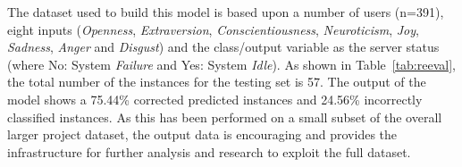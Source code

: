 \documentclass[graybox]{svmult}
\begin{document}
{{{The dataset used to build this model is based upon a number of users
(n=391), eight inputs ({\emph{Openness}}, {\emph{Extraversion}},
{\emph{Conscientiousness}}, {\emph{Neuroticism}}, {\emph{Joy}},
{\emph{Sadness}}, {\emph{Anger}} and {\emph{Disgust}}) and the
class/output variable as the server status (where No: System
{\emph{Failure}} and Yes: System {\emph{Idle}}). As shown in
Table~\ref{tab:reeval}, the total number of the instances for the
testing set is 57. The output of the model shows a 75.44\% corrected
predicted instances and 24.56\% incorrectly classified instances. As
this has been performed on a small subset of the overall larger
project dataset, the output data is encouraging and provides the
infrastructure for further analysis and research to exploit the full
dataset.




}}}
\end{document}

